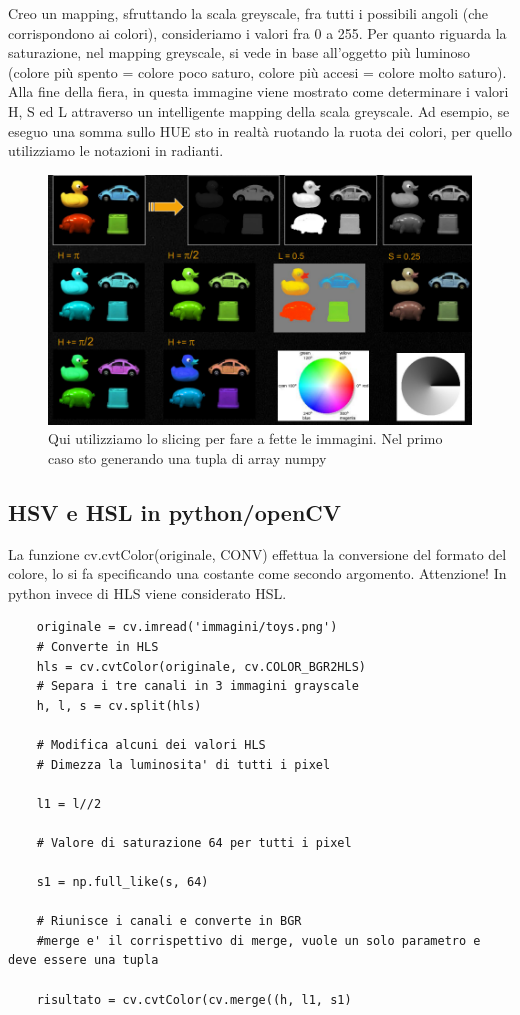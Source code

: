 Creo un mapping, sfruttando la scala greyscale, fra tutti i possibili angoli (che corrispondono ai colori), consideriamo i valori fra 0 a 255. Per quanto riguarda la saturazione, nel mapping greyscale, si vede in base all'oggetto più luminoso (colore più spento = colore poco saturo, colore più accesi = colore molto saturo). Alla fine della fiera, in questa immagine viene mostrato come determinare i valori H, S ed L attraverso un intelligente mapping  della scala greyscale. Ad esempio, se eseguo una somma sullo HUE sto in realtà ruotando la ruota dei colori, per quello utilizziamo le notazioni in radianti.

\begin{figure}[htp]
	\includegraphics[width=\linewidth]{./immagini/opencv_images_c5.png}
	\caption{Qui utilizziamo lo slicing per fare a fette le immagini. Nel primo caso sto generando una tupla di array numpy}
	\label{img:opencv_images_c5}
\end{figure}

\subsection{HSV e HSL in python/openCV}

La funzione cv.cvtColor(originale, CONV) effettua la conversione del formato del colore, lo si fa specificando una costante come secondo argomento. Attenzione! In python invece di HLS viene considerato HSL.

\begin{lstlisting}
	originale = cv.imread('immagini/toys.png')
	# Converte in HLS
	hls = cv.cvtColor(originale, cv.COLOR_BGR2HLS)
	# Separa i tre canali in 3 immagini grayscale
	h, l, s = cv.split(hls)
	
	# Modifica alcuni dei valori HLS
	# Dimezza la luminosita' di tutti i pixel
	
	l1 = l//2
	
	# Valore di saturazione 64 per tutti i pixel
	
	s1 = np.full_like(s, 64)
	
	# Riunisce i canali e converte in BGR
	#merge e' il corrispettivo di merge, vuole un solo parametro e deve essere una tupla
	
	risultato = cv.cvtColor(cv.merge((h, l1, s1) 
\end{lstlisting}

